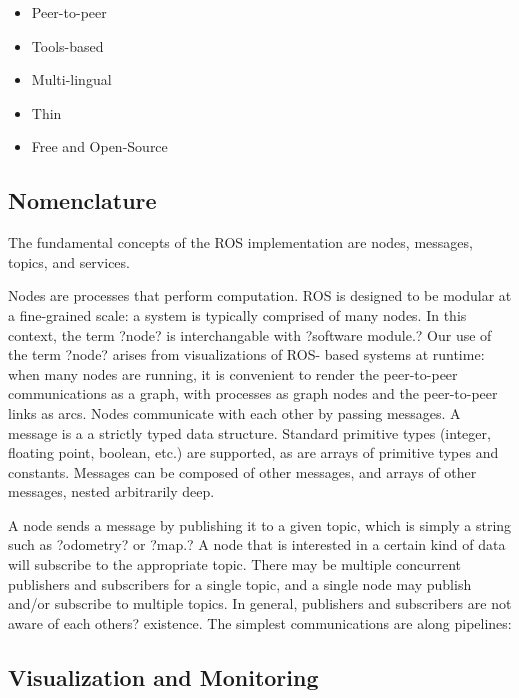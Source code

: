 \begin{itemize}
\item Peer-to-peer 
\item Tools-based 
\item Multi-lingual 
\item Thin
\item Free and Open-Source
\end{itemize}

\subsection{Nomenclature}

The fundamental concepts of the ROS implementation are nodes, messages, topics, and services.

Nodes are processes that perform computation. ROS is designed to be modular at a fine-grained scale: a system is typically comprised of many nodes. In this context, the term ?node? is interchangable with ?software module.? Our use of the term ?node? arises from visualizations of ROS- based systems at runtime: when many nodes are running, it is convenient to render the peer-to-peer communications as a graph, with processes as graph nodes and the peer-to-peer links as arcs.
Nodes communicate with each other by passing messages. A message is a a strictly typed data structure. Standard primitive types (integer, floating point, boolean, etc.) are supported, as are arrays of primitive types and constants. Messages can be composed of other messages, and arrays of other messages, nested arbitrarily deep.

A node sends a message by publishing it to a given topic, which is simply a string such as ?odometry? or ?map.? A node that is interested in a certain kind of data will subscribe to the appropriate topic. There may be multiple concurrent publishers and subscribers for a single topic, and a single node may publish and/or subscribe to multiple topics. In general, publishers and subscribers are not aware of each others? existence.
The simplest communications are along pipelines:

\subsection{Visualization and Monitoring}

